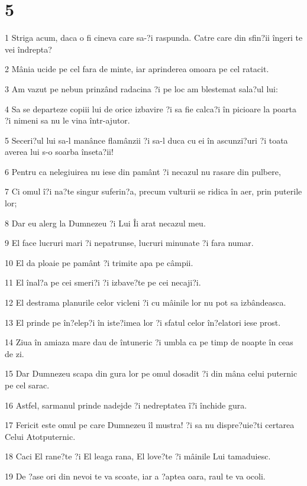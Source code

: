 \chapter{5}

\par 1 Striga acum, daca o fi cineva care sa-?i raspunda. Catre care din sfin?ii îngeri te vei îndrepta?
\par 2 Mânia ucide pe cel fara de minte, iar aprinderea omoara pe cel ratacit.
\par 3 Am vazut pe nebun prinzând radacina ?i pe loc am blestemat sala?ul lui:
\par 4 Sa se departeze copiii lui de orice izbavire ?i sa fie calca?i în picioare la poarta ?i nimeni sa nu le vina într-ajutor.
\par 5 Seceri?ul lui sa-l manânce flamânzii ?i sa-l duca cu ei în ascunzi?uri ?i toata averea lui s-o soarba înseta?ii!
\par 6 Pentru ca nelegiuirea nu iese din pamânt ?i necazul nu rasare din pulbere,
\par 7 Ci omul î?i na?te singur suferin?a, precum vulturii se ridica în aer, prin puterile lor;
\par 8 Dar eu alerg la Dumnezeu ?i Lui Îi arat necazul meu.
\par 9 El face lucruri mari ?i nepatrunse, lucruri minunate ?i fara numar.
\par 10 El da ploaie pe pamânt ?i trimite apa pe câmpii.
\par 11 El înal?a pe cei smeri?i ?i izbave?te pe cei necaji?i.
\par 12 El destrama planurile celor vicleni ?i cu mâinile lor nu pot sa izbândeasca.
\par 13 El prinde pe în?elep?i în iste?imea lor ?i sfatul celor în?elatori iese prost.
\par 14 Ziua în amiaza mare dau de întuneric ?i umbla ca pe timp de noapte în ceas de zi.
\par 15 Dar Dumnezeu scapa din gura lor pe omul dosadit ?i din mâna celui puternic pe cel sarac.
\par 16 Astfel, sarmanul prinde nadejde ?i nedreptatea î?i închide gura.
\par 17 Fericit este omul pe care Dumnezeu îl mustra! ?i sa nu dispre?uie?ti certarea Celui Atotputernic.
\par 18 Caci El rane?te ?i El leaga rana, El love?te ?i mâinile Lui tamaduiesc.
\par 19 De ?ase ori din nevoi te va scoate, iar a ?aptea oara, raul te va ocoli.
